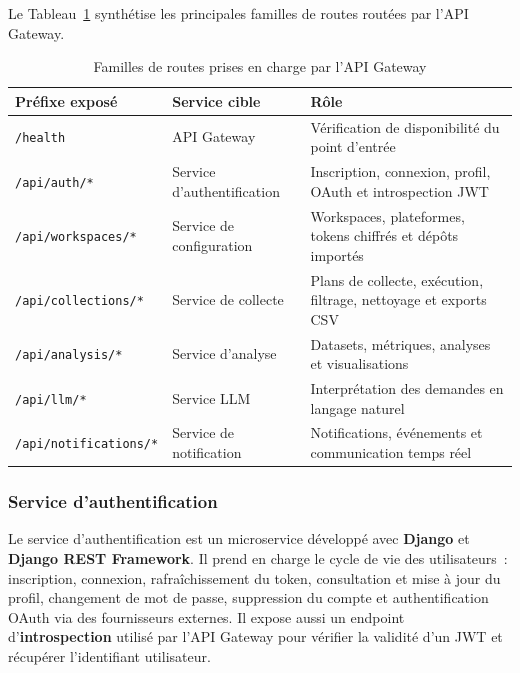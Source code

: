 Le Tableau~\ref{tab:endpoints-gateway} synthétise les principales familles de routes routées par
l'API Gateway.

\begin{table}[H]
\centering
\small
\caption{Familles de routes prises en charge par l'API Gateway}
\label{tab:endpoints-gateway}
\renewcommand{\arraystretch}{1.15}
\begin{tabular}{|>{\raggedright\arraybackslash}p{4cm}
                |>{\raggedright\arraybackslash}p{4.2cm}
                |>{\raggedright\arraybackslash}p{5cm}|}
\hline
\textbf{Préfixe exposé} & \textbf{Service cible} & \textbf{Rôle} \\
\hline
\texttt{/health} & API Gateway & Vérification de disponibilité du point d'entrée \\
\hline
\texttt{/api/auth/*} & Service d'authentification & Inscription, connexion, profil, OAuth et introspection JWT \\
\hline
\texttt{/api/workspaces/*} & Service de configuration & Workspaces, plateformes, tokens chiffrés et dépôts importés \\
\hline
\texttt{/api/collections/*} & Service de collecte & Plans de collecte, exécution, filtrage, nettoyage et exports CSV \\
\hline
\texttt{/api/analysis/*} & Service d'analyse & Datasets, métriques, analyses et visualisations \\
\hline
\texttt{/api/llm/*} & Service LLM & Interprétation des demandes en langage naturel \\
\hline
\texttt{/api/notifications/*} & Service de notification & Notifications, événements et communication temps réel \\
\hline
\end{tabular}
\end{table}

\subsubsection{Service d'authentification}

Le service d'authentification est un microservice développé avec \textbf{Django} et
\textbf{Django REST Framework}. Il prend en charge le cycle de vie des utilisateurs~: inscription,
connexion, rafraîchissement du token, consultation et mise à jour du profil, changement de mot de
passe, suppression du compte et authentification OAuth via des fournisseurs externes. Il expose
aussi un endpoint d'\textbf{introspection} utilisé par l'API Gateway pour vérifier la validité d'un
JWT et récupérer l'identifiant utilisateur.

